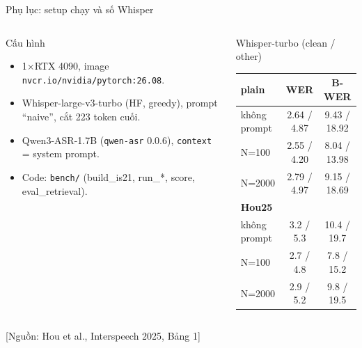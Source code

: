 \documentclass[aspectratio=169,xcolor=table]{beamer}
\newcommand{\src}[1]{{\tiny\color{TextGray}[Nguồn: #1]}}
\begin{document}
\begin{frame}{Phụ lục: setup chạy và số Whisper}
\small
\begin{columns}[T,onlytextwidth]
\begin{block}{Cấu hình}
\begin{itemize}\itemsep2pt
\item 1$\times$RTX 4090, image \texttt{nvcr.io/nvidia/pytorch:26.08}.
\item Whisper-large-v3-turbo (HF, greedy), prompt ``naive'', cắt 223 token cuối.
\item Qwen3-ASR-1.7B (\texttt{qwen-asr} 0.0.6), \texttt{context} = system prompt.
\item Code: \texttt{bench/} (build\_is21, run\_*, score, eval\_retrieval).
\end{itemize}
\end{block}
\begin{block}{Whisper-turbo (clean / other)}
\footnotesize\renewcommand{\arraystretch}{1.15}
\begin{tabular}{@{}lcc@{}}
\toprule
\textbf{plain} & WER & B-WER\\
\midrule
không prompt & 2.64 / 4.87 & 9.43 / 18.92\\
N=100 & 2.55 / 4.20 & 8.04 / 13.98\\
N=2000 & 2.79 / 4.97 & 9.15 / 18.69\\
\midrule
\textbf{Hou25} & & \\
không prompt & 3.2 / 5.3 & 10.4 / 19.7\\
N=100 & 2.7 / 4.8 & 7.8 / 15.2\\
N=2000 & 2.9 / 5.2 & 9.8 / 19.5\\
\bottomrule
\end{tabular}
\end{block}
\end{columns}
\vfill\src{Hou et al., Interspeech 2025, Bảng 1}
\end{frame}
\end{document}
